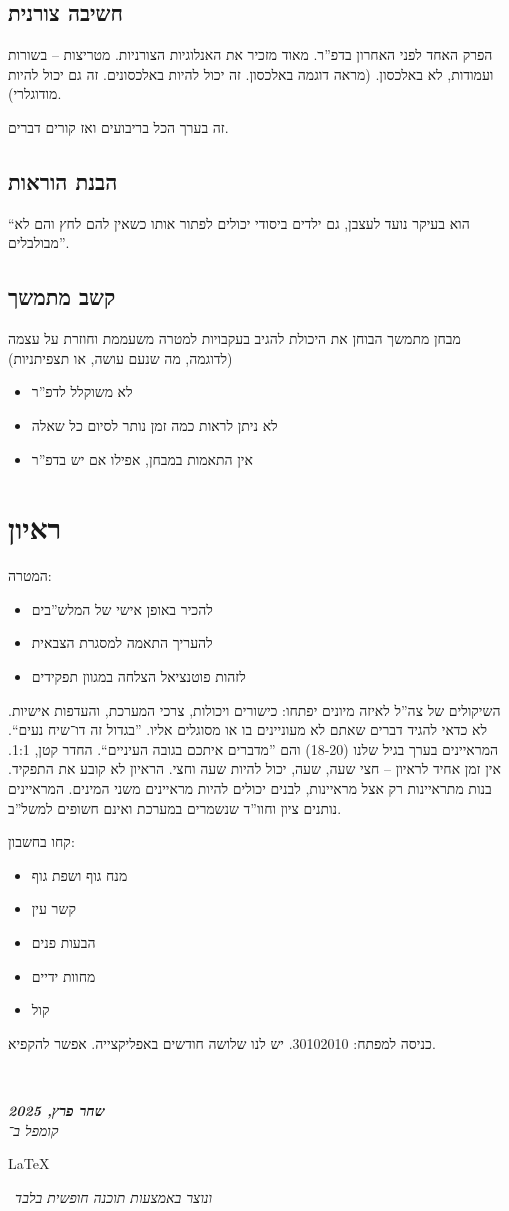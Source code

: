 \documentclass[]{article}
\newcommand\en[1] {\begin{otherlanguage}{english}#1\end{otherlanguage}}
\newcommand\ndoc  {\dotfill \\ \vfil {\begin{center}
			{\textbf{\textit{שחר פרץ, 2025}} \\
				\scriptsize \textit{קומפל ב־}\en{\LaTeX}\,\textit{ ונוצר באמצעות תוכנה חופשית בלבד}}
	\end{center}} \vfil	}
\begin{document}
		
	\subsection{חשיבה צורנית}
	הפרק האחד לפני האחרון בדפ''ר. מאוד מזכיר את האנלוגיות הצורניות. מטריצות – בשורות ועמודות, לא באלכסון. (מראה דוגמה באלכסון. זה יכול להיות באלכסונים. זה גם יכול להיות מודוגלרי). 
	
	זה בערך הכל בריבועים ואז קורים דברים. 
	
	\subsection{הבנת הוראות}
	``הוא בעיקר נועד לעצבן, גם ילדים ביסודי יכולים לפתור אותו כשאין להם לחץ והם לא מבולבלים''. 
	
	\subsection{קשב מתמשך}
	מבחן מתמשך הבוחן את היכולת להגיב בעקבויות למטרה משעממת וחוזרת על עצמה (לדוגמה, מה שנעם עושה, או תצפיתניות)
	\begin{itemize}
		\item לא משוקלל לדפ''ר
		\item לא ניתן לראות כמה זמן נותר לסיום כל שאלה
		\item אין התאמות במבחן, אפילו אם יש בדפ''ר
	\end{itemize}
	
	
	\section{ראיון}
	המטרה: 
	\begin{itemize}
		\item להכיר באופן אישי של המלש''בים
		\item להעריך התאמה למסגרת הצבאית
		\item לזהות פוטנציאל הצלחה במגוון תפקידים
	\end{itemize}
	השיקולים של צה''ל לאיזה מיונים יפתחו: כישורים ויכולות, צרכי המערכת, והעדפות אישיות. לא כדאי להגיד דברים שאתם לא מעוניינים בו או מסוגלים אליו. ''בגדול זה דו־שיח נעים``. המראיינים בערך בגיל שלנו (18-20) והם ''מדברים איתכם בגובה העיניים``. החדר קטן, 1:1. אין זמן אחיד לראיון – חצי שעה, שעה, יכול להיות שעה וחצי. הראיון לא קובע את התפקיד. בנות מתראיינות רק אצל מראיינות, לבנים יכולים להיות מראיינים משני המינים. המראיינים נותנים ציון וחוו''ד שנשמרים במערכת ואינם חשופים למשל''ב. 
	
	קחו בחשבון: 
	\begin{itemize}
		\item מנח גוף ושפת גוף
		\item קשר עין
		\item הבעות פנים
		\item מחוות ידיים
		\item קול
	\end{itemize}
	
	
	
	
	כניסה למפתח: 30102010. יש לנו שלושה חודשים באפליקצייה. אפשר להקפיא. 
	
	
	
	\ndoc
\end{document}
